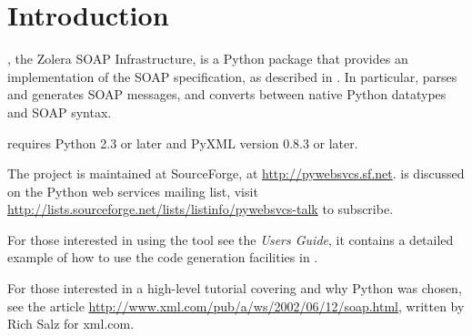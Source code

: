 \chapter{Introduction}

\ZSI{}, the Zolera SOAP Infrastructure, is a Python package that
provides an implementation of the SOAP specification, as described in
.
In particular, \ZSI{} parses and generates SOAP messages, and
converts between native Python datatypes and SOAP syntax.

 requires Python 2.3 or later and PyXML version 0.8.3 or later.

The  project is maintained at SourceForge, at
\url{http://pywebsvcs.sf.net}.
\ZSI{} is discussed on the Python web services mailing list, visit
\url{http://lists.sourceforge.net/lists/listinfo/pywebsvcs-talk}
to subscribe.

For those interested in using the  tool see the \emph{Users
Guide}, it contains a detailed example of how to use the code generation
facilities in .

For those interested in a high-level tutorial covering \ZSI{} and why
Python was chosen, see the article
\url{http://www.xml.com/pub/a/ws/2002/06/12/soap.html}, 
written by Rich Salz for xml.com.

